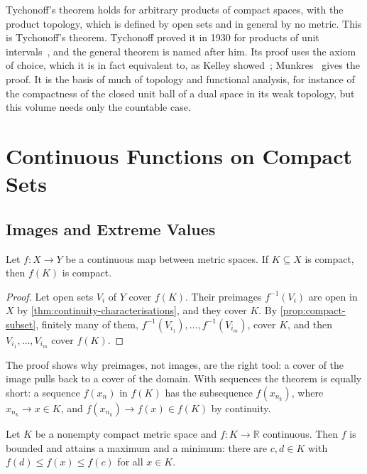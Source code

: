 \begin{note}{Tychonoff's theorem}
 holds for arbitrary products of compact spaces, with the product topology, which is defined by open sets and in general by no metric. This is Tychonoff's theorem. Tychonoff proved it in 1930 for products of unit intervals~\cite{tychonoff1930}, and the general theorem is named after him. Its proof uses the axiom of choice, which it is in fact equivalent to, as Kelley showed~\cite{kelley1950}; Munkres~\cite[Chap.~5]{munkres2000} gives the proof. It is the basis of much of topology and functional analysis, for instance of the compactness of the closed unit ball of a dual space in its weak topology, but this volume needs only the countable case.
\end{note}

\section{Continuous Functions on Compact Sets}
\label{sec:compact-continuous}

\subsection{Images and Extreme Values}

\begin{theorem}
\label{thm:compact-image}
Let $f\colon X\to Y$ be a continuous map between metric spaces. If $K\subseteq X$ is compact, then $f(K)$ is compact.
\end{theorem}

\begin{proof}
Let open sets $V_i$ of $Y$ cover $f(K)$. Their preimages $f^{-1}(V_i)$ are open in $X$ by \cref{thm:continuity-characterisations}, and they cover $K$. By \cref{prop:compact-subset}, finitely many of them, $f^{-1}(V_{i_1}),\ldots,f^{-1}(V_{i_m})$, cover $K$, and then $V_{i_1},\ldots,V_{i_m}$ cover $f(K)$.
\end{proof}

The proof shows why preimages, not images, are the right tool: a cover of the image pulls back to a cover of the domain. With sequences the theorem is equally short: a sequence $f(x_n)$ in $f(K)$ has the subsequence $f(x_{n_k})$, where $x_{n_k}\to x\in K$, and $f(x_{n_k})\to f(x)\in f(K)$ by continuity.

\begin{theorem}
\label{thm:extreme-value-metric}
Let $K$ be a nonempty compact metric space and $f\colon K\to\mathbb R$ continuous. Then $f$ is bounded and attains a maximum and a minimum: there are $c,d\in K$ with $f(d)\le f(x)\le f(c)$ for all $x\in K$.
\end{theorem}

